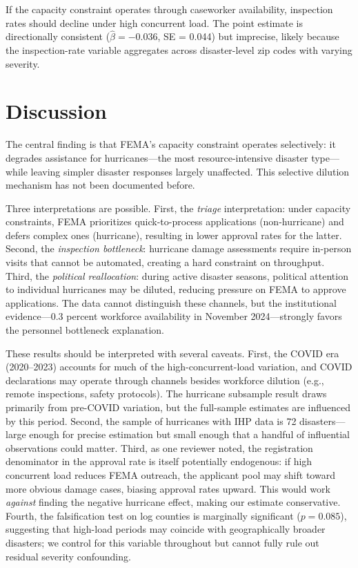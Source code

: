 \documentclass[12pt]{article}
\begin{document}
If the capacity constraint operates through caseworker availability, inspection rates should decline under high concurrent load. The point estimate is directionally consistent ($\hat{\beta} = -0.036$, SE = 0.044) but imprecise, likely because the inspection-rate variable aggregates across disaster-level zip codes with varying severity.

\section{Discussion}

The central finding is that FEMA's capacity constraint operates selectively: it degrades assistance for hurricanes---the most resource-intensive disaster type---while leaving simpler disaster responses largely unaffected. This selective dilution mechanism has not been documented before.

Three interpretations are possible. First, the \textit{triage} interpretation: under capacity constraints, FEMA prioritizes quick-to-process applications (non-hurricane) and defers complex ones (hurricane), resulting in lower approval rates for the latter. Second, the \textit{inspection bottleneck}: hurricane damage assessments require in-person visits that cannot be automated, creating a hard constraint on throughput. Third, the \textit{political reallocation}: during active disaster seasons, political attention to individual hurricanes may be diluted, reducing pressure on FEMA to approve applications. The data cannot distinguish these channels, but the institutional evidence---0.3 percent workforce availability in November 2024---strongly favors the personnel bottleneck explanation.

These results should be interpreted with several caveats. First, the COVID era (2020--2023) accounts for much of the high-concurrent-load variation, and COVID declarations may operate through channels besides workforce dilution (e.g., remote inspections, safety protocols). The hurricane subsample result draws primarily from pre-COVID variation, but the full-sample estimates are influenced by this period. Second, the sample of hurricanes with IHP data is 72 disasters---large enough for precise estimation but small enough that a handful of influential observations could matter. Third, as one reviewer noted, the registration denominator in the approval rate is itself potentially endogenous: if high concurrent load reduces FEMA outreach, the applicant pool may shift toward more obvious damage cases, biasing approval rates upward. This would work \textit{against} finding the negative hurricane effect, making our estimate conservative. Fourth, the falsification test on log counties is marginally significant ($p = 0.085$), suggesting that high-load periods may coincide with geographically broader disasters; we control for this variable throughout but cannot fully rule out residual severity confounding.
\end{document}
